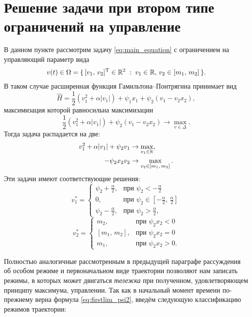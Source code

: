 \section{Решение задачи при втором типе ограничений на управление}

В данном пункте рассмотрим задачу \eqref{eq:main_equation} с ограничением на управляющий параметр вида
$$
        v(t) \in \Omega =
        \{\,
                [v_1,\, v_2]^{\mathrm{T}} \in \mathbb{R}^2
                \;:\;
                v_1 \in \mathbb{R},\,
                v_2 \in [m_1,\,m_2]
        \,\}.
$$
В таком случае расширенная функция Гамильтона--Понтрягина принимает вид
$$
        \hat H = \frac{1}{2}(v_1^2 + \alpha|v_1|) + \psi_1x_1 + \psi_2(v_1 - v_2x_2),
$$
максимизация которой равносильна максимизации
$$
        \frac{1}{2}(v_1^2 + \alpha|v_1|) + \psi_2(v_1 - v_2x_2) \rightarrow \max\limits_{v \in \Delta}.
$$
Тогда задача распадается на две:
$$
        \begin{aligned}
                v_1^2 + \alpha|v_1| + \psi_2v_1 & \rightarrow \max\limits_{v_1 \in \mathbb{R}}, \\
                -\psi_2x_2v_2 & \rightarrow \max\limits_{v_2\in[m_1,\,m_2]}.
        \end{aligned}
$$
Эти задачи имеют соответствующие решения:
$$
        v_1^* =
        \begin{cases}
                \psi_2 + \frac{\alpha}{2}, &
                \mbox{при $\psi_2<-\frac{\alpha}{2}$} \\
                0, &\mbox{при $\psi_2 \in [-\frac{\alpha}{2},\,\frac{\alpha}{2}]$} \\
                \psi_2 - \frac \alpha 2, &\mbox{при $\psi_2 > \frac \alpha 2$},
        \end{cases}
$$
$$
        v_2^* = 
        \begin{cases}
                m_2, &\mbox{при $\psi_2 x_2 < 0$}\\
                [m_1,\,m_2], &\mbox{при $\psi_2 x_2 = 0$} \\
                m_1, &\mbox{при $\psi_2 x_2 > 0$}.
        \end{cases}
$$

Полностью аналогичные рассмотренным в предыдущей параграфе рассуждения об особом режиме и первоначальном виде траектории позволяют нам записать режимы, в которых может двигаться \textit{тележка} при полученном, удовлетворяющем принципу максимума, управлении. Так как в начальный момент времени по-прежнему верна формула \eqref{eq:firstlim_psi2}, введём следующую классификацию режимов траектории:

